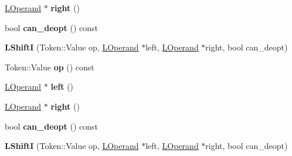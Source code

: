 \begin{DoxyCompactItemize}
\item 
\hyperlink{classv8_1_1internal_1_1_l_operand}{L\+Operand} $\ast$ {\bfseries right} ()\hypertarget{classv8_1_1internal_1_1_l_shift_i_a728880e17b20375b612e631dcc13dc3e}{}\label{classv8_1_1internal_1_1_l_shift_i_a728880e17b20375b612e631dcc13dc3e}

\item 
bool {\bfseries can\+\_\+deopt} () const \hypertarget{classv8_1_1internal_1_1_l_shift_i_abbbf228b7c1516e1e419ef9ffbcc97b6}{}\label{classv8_1_1internal_1_1_l_shift_i_abbbf228b7c1516e1e419ef9ffbcc97b6}

\item 
{\bfseries L\+ShiftI} (Token\+::\+Value op, \hyperlink{classv8_1_1internal_1_1_l_operand}{L\+Operand} $\ast$left, \hyperlink{classv8_1_1internal_1_1_l_operand}{L\+Operand} $\ast$right, bool can\+\_\+deopt)\hypertarget{classv8_1_1internal_1_1_l_shift_i_adaac229c54d2a924ac68d595fc30703a}{}\label{classv8_1_1internal_1_1_l_shift_i_adaac229c54d2a924ac68d595fc30703a}

\item 
Token\+::\+Value {\bfseries op} () const \hypertarget{classv8_1_1internal_1_1_l_shift_i_af3e3cecd04a31cf7df5a66653f6c009d}{}\label{classv8_1_1internal_1_1_l_shift_i_af3e3cecd04a31cf7df5a66653f6c009d}

\item 
\hyperlink{classv8_1_1internal_1_1_l_operand}{L\+Operand} $\ast$ {\bfseries left} ()\hypertarget{classv8_1_1internal_1_1_l_shift_i_a5ef728d134ab0ae5565b90793364add0}{}\label{classv8_1_1internal_1_1_l_shift_i_a5ef728d134ab0ae5565b90793364add0}

\item 
\hyperlink{classv8_1_1internal_1_1_l_operand}{L\+Operand} $\ast$ {\bfseries right} ()\hypertarget{classv8_1_1internal_1_1_l_shift_i_a728880e17b20375b612e631dcc13dc3e}{}\label{classv8_1_1internal_1_1_l_shift_i_a728880e17b20375b612e631dcc13dc3e}

\item 
bool {\bfseries can\+\_\+deopt} () const \hypertarget{classv8_1_1internal_1_1_l_shift_i_abbbf228b7c1516e1e419ef9ffbcc97b6}{}\label{classv8_1_1internal_1_1_l_shift_i_abbbf228b7c1516e1e419ef9ffbcc97b6}

\item 
{\bfseries L\+ShiftI} (Token\+::\+Value op, \hyperlink{classv8_1_1internal_1_1_l_operand}{L\+Operand} $\ast$left, \hyperlink{classv8_1_1internal_1_1_l_operand}{L\+Operand} $\ast$right, bool can\+\_\+deopt)\hypertarget{classv8_1_1internal_1_1_l_shift_i_adaac229c54d2a924ac68d595fc30703a}{}\label{classv8_1_1internal_1_1_l_shift_i_adaac229c54d2a924ac68d595fc30703a}


\end{DoxyCompactItemize}
